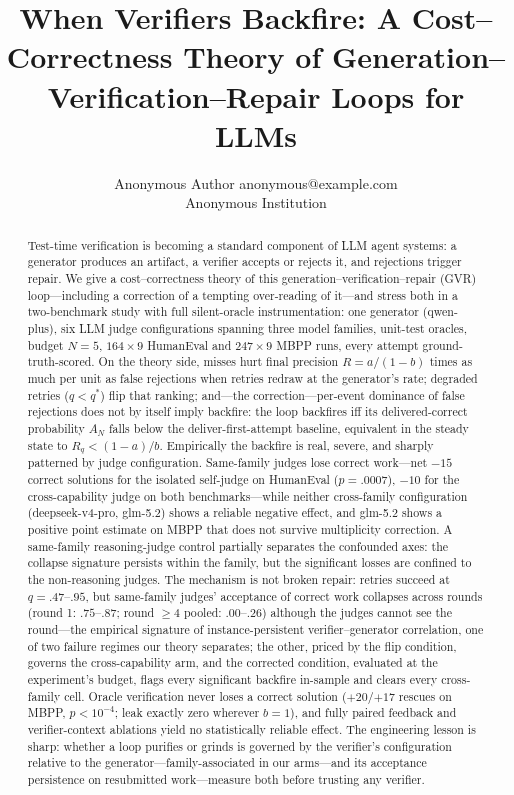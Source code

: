 \documentclass[10pt]{article}
\title{When Verifiers Backfire: A Cost--Correctness Theory of
Generation--Verification--Repair Loops for LLMs}
\author{\name Anonymous Author \email anonymous@example.com \\
      \addr Anonymous Institution}
\begin{document}
\maketitle

\begin{abstract}
Test-time verification is becoming a standard component of LLM
agent systems: a generator produces an artifact, a verifier
accepts or rejects it, and rejections trigger repair.  We give a
cost--correctness theory of this generation--verification--repair
(GVR) loop---including a correction of a tempting over-reading of
it---and stress both in a two-benchmark study with full
silent-oracle instrumentation: one generator (qwen-plus), six LLM
judge configurations spanning three model families, unit-test
oracles, budget $N{=}5$, $164 \times 9$ HumanEval and $247 \times 9$
MBPP runs, every attempt ground-truth-scored.  On the theory side, misses hurt
final precision $R = a/(1-b)$ times as much per unit as false
rejections when retries redraw at the generator's rate; degraded
retries ($q < q^\ast$) flip that ranking; and---the
correction---per-event dominance of false rejections does not by
itself imply backfire: the loop backfires iff its delivered-correct
probability $A_N$ falls below the deliver-first-attempt baseline,
equivalent in the steady state to $R_q < (1-a)/b$.  Empirically the
backfire is real, severe, and sharply patterned by judge
configuration.  Same-family judges lose correct work---net $-15$
correct solutions for the isolated self-judge on HumanEval
($p=.0007$), $-10$ for the cross-capability judge on both
benchmarks---while neither cross-family configuration
(deepseek-v4-pro, glm-5.2) shows a reliable negative effect, and
glm-5.2 shows a positive point estimate on MBPP that does not
survive multiplicity correction.  A same-family reasoning-judge
control partially separates the confounded axes: the collapse
signature persists within the family, but the significant losses
are confined to the non-reasoning judges.
The mechanism is not broken repair: retries succeed at
$q=.47$--$.95$, but same-family judges' acceptance of correct work
collapses across rounds (round 1: $.75$--$.87$; round $\ge 4$
pooled: $.00$--$.26$) although the judges cannot see the
round---the
empirical signature of instance-persistent verifier--generator
correlation, one of two failure regimes our theory separates; the
other, priced by the flip condition, governs the cross-capability
arm, and the corrected condition, evaluated at the experiment's
budget, flags every significant backfire in-sample and clears
every cross-family cell.  Oracle verification
never loses a correct solution ($+20$/$+17$ rescues on MBPP,
$p<10^{-4}$; leak exactly zero wherever $b{=}1$), and fully paired
feedback and verifier-context ablations yield no statistically
reliable effect.  The engineering lesson is sharp: whether a loop
purifies or grinds is governed by the verifier's configuration
relative to the generator---family-associated in our arms---and
its acceptance persistence on resubmitted work---measure both
before trusting any verifier.
\end{abstract}
\end{document}
